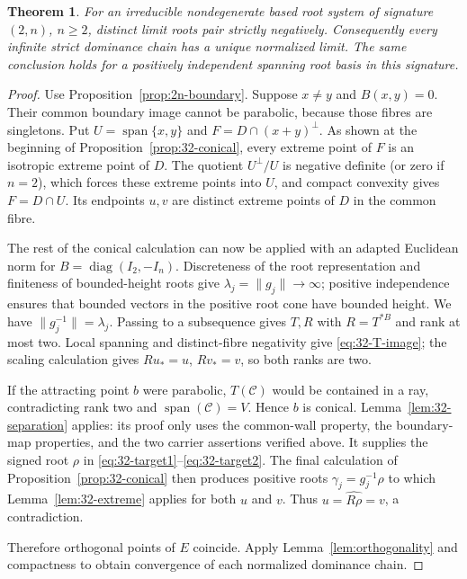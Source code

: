 \documentclass[11pt,reqno]{amsart}
\theoremstyle{plain}
\newtheorem{theorem}{Theorem}[section]
\theoremstyle{definition}
\theoremstyle{remark}
\numberwithin{equation}{section}
\begin{document}
\begin{theorem}\label{thm:positive-index-two}
For an irreducible nondegenerate based root system of signature $(2,n)$, $n\geq2$, distinct limit roots pair strictly negatively. Consequently every infinite strict dominance chain has a unique normalized limit. The same conclusion holds for a positively independent spanning root basis in this signature.
\end{theorem}
\begin{proof}
Use Proposition~\ref{prop:2n-boundary}. Suppose $x\ne y$ and $B(x,y)=0$. Their common boundary image cannot be parabolic, because those fibres are singletons. Put $U=\operatorname{span}\{x,y\}$ and $F=D\cap(x+y)^\perp$. As shown at the beginning of Proposition~\ref{prop:32-conical}, every extreme point of $F$ is an isotropic extreme point of $D$. The quotient $U^\perp/U$ is negative definite (or zero if $n=2$), which forces these extreme points into $U$, and compact convexity gives $F=D\cap U$. Its endpoints $u,v$ are distinct extreme points of $D$ in the common fibre.

The rest of the conical calculation can now be applied with an adapted Euclidean norm for $B=\operatorname{diag}(I_2,-I_n)$. Discreteness of the root representation and finiteness of bounded-height roots give $\lambda_j=\|g_j\|\to\infty$; positive independence ensures that bounded vectors in the positive root cone have bounded height. We have $\|g_j^{-1}\|=\lambda_j$. Passing to a subsequence gives $T,R$ with $R=T^{*B}$ and rank at most two. Local spanning and distinct-fibre negativity give \eqref{eq:32-T-image}; the scaling calculation gives $Ru_*=u$, $Rv_*=v$, so both ranks are two.

If the attracting point $b$ were parabolic, $T(\mathcal C)$ would be contained in a ray, contradicting rank two and $\operatorname{span}(\mathcal C)=V$. Hence $b$ is conical. Lemma~\ref{lem:32-separation} applies: its proof only uses the common-wall property, the boundary-map properties, and the two carrier assertions verified above. It supplies the signed root $\rho$ in \eqref{eq:32-target1}--\eqref{eq:32-target2}. The final calculation of Proposition~\ref{prop:32-conical} then produces positive roots $\gamma_j=g_j^{-1}\rho$ to which Lemma~\ref{lem:32-extreme} applies for both $u$ and $v$. Thus $u=\widehat{R\rho}=v$, a contradiction.

Therefore orthogonal points of $E$ coincide. Apply Lemma~\ref{lem:orthogonality} and compactness to obtain convergence of each normalized dominance chain.
\end{proof}
\end{document}
